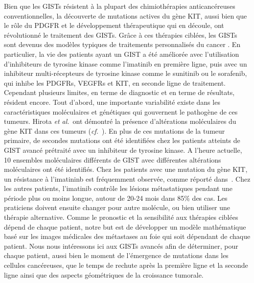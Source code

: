 \documentclass[11pt]{amsart}
\numberwithin{equation}{section}
\newcommand{\etal}{{\it et al.}}
\newcommand{\cf}{\textit{cf.}~}
\begin{document}
Bien que les GISTs résistent à la plupart des chimiothérapies anticancéreuses conventionnelles, 
la découverte de mutations actives du gène KIT, aussi bien que le rôle du PDGFR et le développement thérapeutique qui en découle, ont révolutionné le traitement des GISTs.
Grâce à ces thérapies ciblées, les GISTs sont devenus des modèles typiques de traitements personnalisés du cancer \cite{Blay2012}. 
En particulier, la vie des patients ayant un GIST a été améliorée avec l'utilisation d'inhibiteurs de tyrosine kinase comme l'imatinib en première ligne, puis avec un inhibiteur multi-récepteurs de tyrosine kinase comme
le sunitinib ou le sorafenib,  
qui inhibe les PDGFRs, VEGFRs et KIT, en seconde ligne de traitement. 
Cependant plusieurs limites, en terme de diagnostic et en terme de résultats, résident encore.
Tout d'abord, une importante variabilité existe dans les caractéristiques moléculaires et génétiques qui gouvernent le pathogène de ces tumeurs.
Hirota \etal\ ont démontré la présence d'altérations moléculaires du gène KIT dans ces tumeurs (\cf \cite{Hirota1998}). 
En plus de ces mutations de la tumeur primaire, de secondes mutations ont été identifiées chez les patients atteints de GIST avancé prétraité avec un inhibiteur de tyrosine kinase. A l'heure actuelle, 10 ensembles moléculaires différents de GIST avec différentes altérations moléculaires ont été identifiés. 
Chez les patients avec une mutation du gène KIT, un résistance à l'imatininb est fréquemment observée, comme réporté dans~\cite{Blay2011}. 
Chez les autres patients, l'imatinib contrôle les lésions métastatiques pendant une période plus ou moins longue, autour de 
20-24 mois dans 85\% des cas. 
Les praticiens doivent ensuite changer pour autre molécule, ou bien utiliser une thérapie alternative. Comme le pronostic et la sensibilité aux thérapies ciblées dépend de chaque patient, notre but est de développer un modèle mathématique basé sur les images médicales des métastases au foie qui soit dépendant de chaque patient.
Nous nous intéressons ici aux GISTs avancés afin de déterminer, pour chaque patient, aussi bien le moment de l'émergence de mutations dans les cellules cancéreuses, que le temps de rechute après la première ligne et la seconde ligne ainsi que des aspects géométriques de la croissance tumorale.
\end{document}
